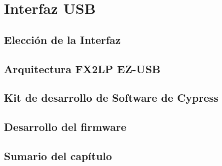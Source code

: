 \chapter{Interfaz USB}
	
	\label{cap:cy}
	\section{Elección de la Interfaz}
		
	\section{Arquitectura FX2LP EZ-USB}
		
	\section{Kit de desarrollo de Software de Cypress}
		
	\section{Desarrollo del firmware}
		
	\section{Sumario del capítulo}
		